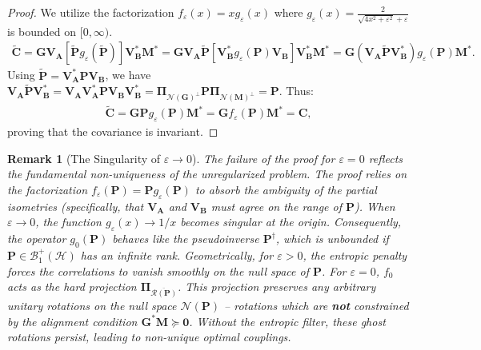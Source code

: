 \documentclass[noinfoline]{imsart}\setcounter{tocdepth}{2}
\newcommand{\m}[1]{\mathbf{#1}}
\renewcommand{\c}[1]{\mathcal{#1}}
\theoremstyle{plain}
\newtheorem{remark}{Remark}[section]
\begin{document}
\begin{proof}
We utilize the factorization $f_{\varepsilon}(x) = x g_{\varepsilon}(x)$ where $g_{\varepsilon}(x) = \frac{2}{\sqrt{4x^2+\varepsilon^2}+\varepsilon}$ is bounded on $[0, \infty)$.
\begin{align*}
    \tilde{\m{C}} = \m{G} \m{V}_{\m{A}} \left[ \tilde{\m{P}} g_{\varepsilon}(\tilde{\m{P}}) \right] \m{V}_{\m{B}}^* \m{M}^* = \m{G} \m{V}_{\m{A}} \tilde{\m{P}} \left[ \m{V}_{\m{B}}^* g_{\varepsilon}(\m{P}) \m{V}_{\m{B}} \right] \m{V}_{\m{B}}^* \m{M}^* = \m{G} (\m{V}_{\m{A}} \tilde{\m{P}} \m{V}_{\m{B}}^*) g_{\varepsilon}(\m{P}) \m{M}^*.
\end{align*}
Using $\tilde{\m{P}} = \m{V}_{\m{A}}^* \m{P} \m{V}_{\m{B}}$, we have $\m{V}_{\m{A}} \tilde{\m{P}} \m{V}_{\m{B}}^* = \m{V}_{\m{A}} \m{V}_{\m{A}}^* \m{P} \m{V}_{\m{B}} \m{V}_{\m{B}}^* = \m{\Pi}_{\c{N}(\m{G})^\perp} \m{P} \m{\Pi}_{\c{N}(\m{M})^\perp} = \m{P}$. Thus:
\begin{align*}
    \tilde{\m{C}} = \m{G} \m{P} g_{\varepsilon}(\m{P}) \m{M}^* = \m{G} f_{\varepsilon}(\m{P}) \m{M}^* = \m{C},
\end{align*}
proving that the covariance is invariant.
\end{proof}

\begin{remark}[The Singularity of $\varepsilon \to 0$]
The failure of the proof for $\varepsilon=0$ reflects the fundamental non-uniqueness of the unregularized problem.
The proof relies on the factorization $f_{\varepsilon}(\m{P}) = \m{P} g_{\varepsilon}(\m{P})$ to \emph{absorb} the ambiguity of the partial isometries (specifically, that $\m{V}_{\m{A}}$ and $\m{V}_{\m{B}}$ must agree on the range of $\m{P}$).
When $\varepsilon \to 0$, the function $g_{\varepsilon}(x) \to 1/x$ becomes singular at the origin. Consequently, the operator $g_{0}(\m{P})$ behaves like the pseudoinverse $\m{P}^{\dagger}$, which is unbounded if $\m{P} \in \c{B}_{1}^{+}(\c{H})$ has an infinite rank.
Geometrically, for $\varepsilon > 0$, the entropic penalty forces the correlations to vanish smoothly on the null space of $\m{P}$. For $\varepsilon = 0$, $f_0$ acts as the hard projection $\m{\Pi}_{\overline{\c{R}(\m{P})}}$. This projection preserves any arbitrary unitary rotations on the null space $\c{N}(\m{P})$ -- rotations which are \textbf{not} constrained by the alignment condition $\m{G}^* \m{M} \succeq \m{0}$. Without the entropic \emph{filter}, these ghost rotations persist, leading to non-unique optimal couplings.
\end{remark}
\end{document}
